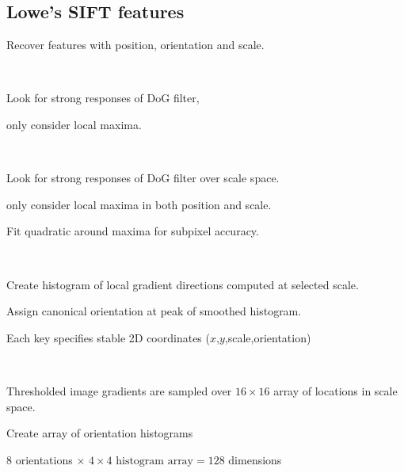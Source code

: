\begin{compactdesc}
		\subsection{Lowe's SIFT features}
		Recover features with position, orientation and scale. 
	\item[\lp{Position}] \hfill\\
		\begin{enumerate*}[label=\protect\circled{\arabic*},itemjoin=]
		\item Look for strong responses of DoG filter,\\
		\item only consider local maxima.\\
		\end{enumerate*}
	\item[\lp{Scale}] \hfill\\
		\begin{enumerate*}[label=\protect\circled{\arabic*},itemjoin=]
			\item Look for strong responses of DoG filter over scale space. \\
			\item only consider local maxima in both position and scale. \\
			\item Fit quadratic around maxima for subpixel accuracy.\\
		\end{enumerate*}
	\item[\lp{Orientation}] \hfill\\
		\begin{enumerate*}[label=\protect\circled{\arabic*},itemjoin=]
			\item Create histogram of local gradient directions computed at selected scale.\\
			\item Assign canonical orientation at peak of smoothed histogram.\\
			\item Each key specifies stable 2D coordinates ($x$,$y$,scale,orientation)\\
		\end{enumerate*}
	\item[\lp{SIFT descriptior}]\hfill\\
		\begin{enumerate*}[label=\protect\circled{\arabic*},itemjoin=]
			\item Thresholded image gradients are sampled over $16\times16$ array of locations in scale space.\\
			\item Create array of orientation histograms\\
			\item 8 orientations $\times$ $4\times4\text{ histogram array}=128$ dimensions\\
		\end{enumerate*}
\end{compactdesc}
